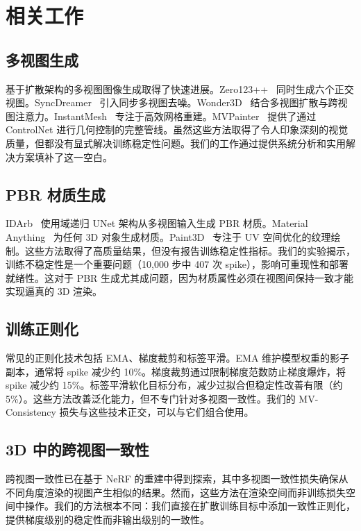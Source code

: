 \documentclass{article}
\begin{document}
\section{相关工作}

\subsection{多视图生成}

基于扩散架构的多视图图像生成取得了快速进展。Zero123++~\cite{zero123pp} 同时生成六个正交视图。SyncDreamer~\cite{syncdreamer} 引入同步多视图去噪。Wonder3D~\cite{wonder3d} 结合多视图扩散与跨视图注意力。InstantMesh~\cite{instantmesh} 专注于高效网格重建。MVPainter~\cite{mvpainter} 提供了通过 ControlNet 进行几何控制的完整管线。虽然这些方法取得了令人印象深刻的视觉质量，但都没有显式解决训练稳定性问题。我们的工作通过提供系统分析和实用解决方案填补了这一空白。

\subsection{PBR 材质生成}

IDArb~\cite{idarb} 使用域递归 UNet 架构从多视图输入生成 PBR 材质。Material Anything~\cite{materialanything} 为任何 3D 对象生成材质。Paint3D~\cite{paint3d} 专注于 UV 空间优化的纹理绘制。这些方法取得了高质量结果，但没有报告训练稳定性指标。我们的实验揭示，训练不稳定性是一个重要问题（10,000 步中 407 次 spike），影响可重现性和部署就绪性。这对于 PBR 生成尤其成问题，因为材质属性必须在视图间保持一致才能实现逼真的 3D 渲染。

\subsection{训练正则化}

常见的正则化技术包括 EMA、梯度裁剪和标签平滑。EMA 维护模型权重的影子副本，通常将 spike 减少约 10\%。梯度裁剪通过限制梯度范数防止梯度爆炸，将 spike 减少约 15\%。标签平滑软化目标分布，减少过拟合但稳定性改善有限（约 5\%）。这些方法改善泛化能力，但不专门针对多视图一致性。我们的 MV-Consistency 损失与这些技术正交，可以与它们组合使用。

\subsection{3D 中的跨视图一致性}

跨视图一致性已在基于 NeRF 的重建中得到探索，其中多视图一致性损失确保从不同角度渲染的视图产生相似的结果。然而，这些方法在渲染空间而非训练损失空间中操作。我们的方法根本不同：我们直接在扩散训练目标中添加一致性正则化，提供梯度级别的稳定性而非输出级别的一致性。
\end{document}
